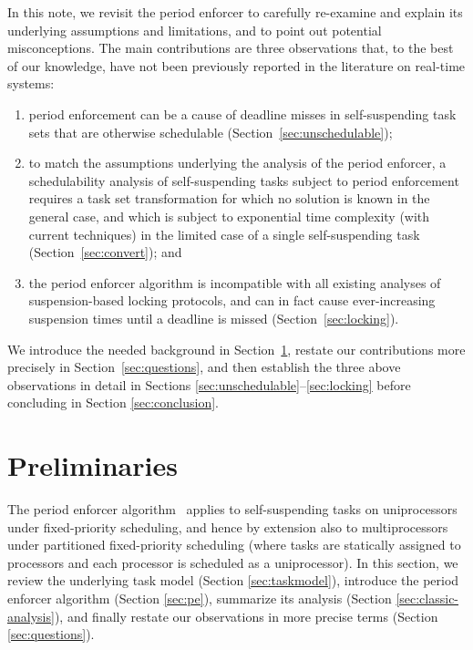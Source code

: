 In this note, we revisit the period enforcer \cite{Raj:suspension1991} to carefully re-examine and explain its underlying assumptions and limitations, and to point out potential misconceptions.  The main contributions are three observations that, to the best of our knowledge, have not been previously reported in the literature on real-time systems:
\begin{enumerate}
	\item period enforcement can be a cause of deadline misses in self-suspending task sets that are otherwise schedulable (Section~\ref{sec:unschedulable}); 
	\item to match the assumptions underlying the analysis of the period enforcer, a schedulability analysis of self-suspending tasks subject to period enforcement requires a task set  transformation for which no solution is known  in the general case, and which  is subject to exponential time complexity (with current techniques)  in the limited case of a single self-suspending task (Section~\ref{sec:convert}); and
	\item the period enforcer algorithm is incompatible with all existing analyses of suspension-based locking protocols, and can in fact cause ever-increasing suspension times until a deadline is missed (Section~\ref{sec:locking}).
\end{enumerate}


We introduce the needed background in Section~\ref{sec:prelim}, restate our contributions more precisely in Section~\ref{sec:questions}, and then establish the three above  observations in detail in Sections \ref{sec:unschedulable}--\ref{sec:locking} before concluding in Section \ref{sec:conclusion}.

\section{Preliminaries}
\label{sec:prelim}

The period enforcer algorithm~\cite{Raj:suspension1991} applies to self-suspending tasks on uniprocessors under fixed-priority scheduling, and hence by extension also to multiprocessors under partitioned fixed-priority scheduling (where tasks are statically assigned to processors and each processor is scheduled as a uniprocessor). In this section, we review the underlying task model (Section \ref{sec:taskmodel}), introduce the period enforcer algorithm (Section \ref{sec:pe}), summarize its analysis (Section \ref{sec:classic-analysis}), and finally restate our observations in more precise terms (Section \ref{sec:questions}).

